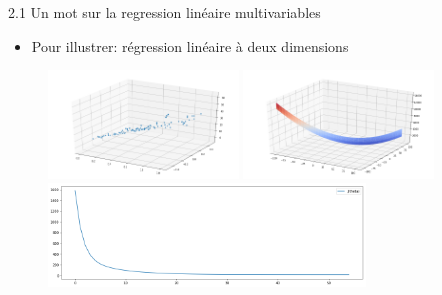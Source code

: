 \begin{frame}{2.1 Un mot sur la regression linéaire multivariables}
  \begin{itemize}
  \item Pour illustrer: régression linéaire à deux dimensions
  \end{itemize}
  \begin{figure}
    \includegraphics[width=0.45\textwidth]{fig/multiVarData.png}
    \includegraphics[width=0.45\textwidth]{fig/multiVarCostFct.png}\\
    \includegraphics[width=0.75\textwidth]{fig/multiVarDesc.png}
  \end{figure}
\end{frame}


